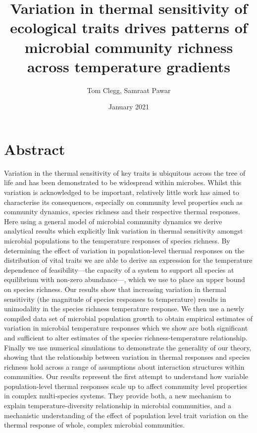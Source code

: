\documentclass{article}
\title{Variation in thermal sensitivity of ecological traits drives patterns of microbial community richness across temperature gradients}
\author{Tom Clegg, Samraat Pawar}
\date{January 2021}
\begin{document}
\maketitle

\section*{Abstract}

Variation in the thermal sensitivity of key traits is ubiquitous across the tree of life and has been demonstrated to be widespread within microbes. Whilst this variation is acknowledged to be important, relatively little work has aimed to characterise its consequences, especially on community level properties such as community dynamics, species richness and their respective thermal responses. Here using a general model of microbial community dynamics we derive analytical results which explicitly link variation in thermal sensitivity amongst microbial populations to the temperature responses of species richness. By determining the effect of variation in population-level thermal responses on the distribution of vital traits we are able to derive an expression for the temperature dependence of feasibility---the capacity of a system to support all species at equilibrium with non-zero abundance---, which we use to place an upper bound on species richness. Our results show that increasing variation in thermal sensitivity (the magnitude of species responses to temperature) results in unimodality in the species richness temperature response. We then use a newly compiled data set of microbial population growth to obtain empirical estimates of variation in microbial temperature responses which we show are both significant and sufficient to alter estimates of the species richness-temperature relationship. Finally we use numerical simulations to demonstrate the generality of our theory, showing that the relationship between variation in thermal responses and species richness hold across a range of assumptions about interaction structures within communities. Our results represent the first attempt to understand how variable population-level thermal responses scale up to affect community level properties in complex multi-species systems. They provide both, a new mechanism to explain temperature-diversity relationship in microbial communities, and a mechanistic understanding of the effect of population level trait variation on the thermal response of whole, complex microbial communities. 

\clearpage
\end{document}
